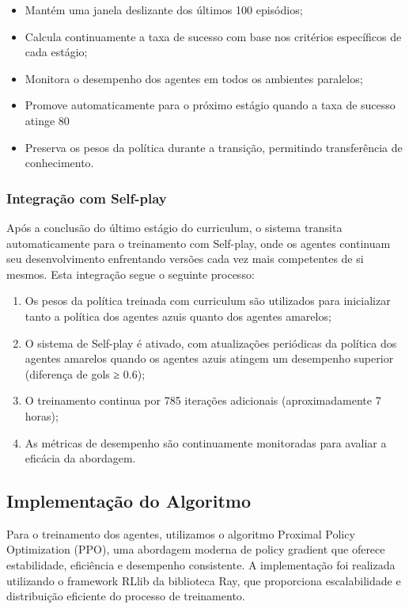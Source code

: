 \begin{itemize}
    \item Mantém uma janela deslizante dos últimos 100 episódios;
    \item Calcula continuamente a taxa de sucesso com base nos critérios específicos de cada estágio;
    \item Monitora o desempenho dos agentes em todos os ambientes paralelos;
    \item Promove automaticamente para o próximo estágio quando a taxa de sucesso atinge 80%
    \item Preserva os pesos da política durante a transição, permitindo transferência de conhecimento.
\end{itemize}

\subsubsection{Integração com Self-play}

Após a conclusão do último estágio do curriculum, o sistema transita automaticamente para o treinamento com Self-play, onde os agentes continuam seu desenvolvimento enfrentando versões cada vez mais competentes de si mesmos. Esta integração segue o seguinte processo:

\begin{enumerate}
    \item Os pesos da política treinada com curriculum são utilizados para inicializar tanto a política dos agentes azuis quanto dos agentes amarelos;
    \item O sistema de Self-play é ativado, com atualizações periódicas da política dos agentes amarelos quando os agentes azuis atingem um desempenho superior (diferença de gols ≥ 0.6);
    \item O treinamento continua por 785 iterações adicionais (aproximadamente 7 horas);
    \item As métricas de desempenho são continuamente monitoradas para avaliar a eficácia da abordagem.
\end{enumerate}

\subsection{Implementação do Algoritmo}

Para o treinamento dos agentes, utilizamos o algoritmo Proximal Policy Optimization (PPO), uma abordagem moderna de policy gradient que oferece estabilidade, eficiência e desempenho consistente. A implementação foi realizada utilizando o framework RLlib da biblioteca Ray, que proporciona escalabilidade e distribuição eficiente do processo de treinamento.

